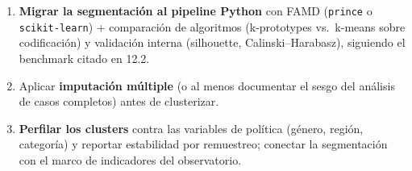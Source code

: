 \begin{enumerate}
  \item \textbf{Migrar la segmentación al pipeline Python} con FAMD
        (\texttt{prince} o \texttt{scikit-learn}) + comparación de algoritmos
        (k-prototypes vs.\ k-means sobre codificación) y validación interna
        (silhouette, Calinski--Harabasz), siguiendo el benchmark citado en 12.2.
  \item Aplicar \textbf{imputación múltiple} (o al menos documentar el sesgo
        del análisis de casos completos) antes de clusterizar.
  \item \textbf{Perfilar los clusters} contra las variables de política
        (género, región, categoría) y reportar estabilidad por remuestreo;
        conectar la segmentación con el marco de indicadores del observatorio.
\end{enumerate}
